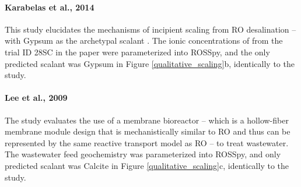 \paragraph{Karabelas et al., 2014 \cite{Karabelas2014IncipientChannels}}
This study elucidates the mechanisms of incipient scaling from RO desalination -- with Gypsum as the archetypal scalant \cite{Lyster2009CoupledModule,Radu2014ASystems}. The ionic concentrations of from the trial ID 28SC in the paper were parameterized into ROSSpy, and the only predicted scalant was Gypsum in Figure \ref{qualitative_scaling}b, identically to the study.  

\paragraph{Lee et al., 2009 \cite{Lee2009MembraneWastewater}}
The study  evaluates the use of a membrane bioreactor -- which is a hollow-fiber membrane module design that is mechanistically similar to RO and thus can be represented by the same reactive transport model as RO -- to treat wastewater. The wastewater feed geochemistry was parameterized into ROSSpy, and only predicted scalant was Calcite in Figure \ref{qualitative_scaling}c, identically to the study.

